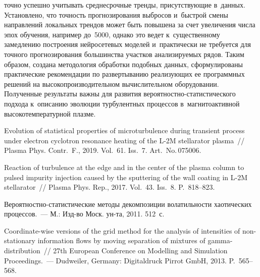\begin{multicols}{2}

\noindent
точно успешно учитывать среднесрочные тренды,
 присутствующие в~данных. Установлено, что точность прогнозирования 
 выбросов и~быстрой смены направлений локальных трендов может быть 
 повышена за счет увеличения числа эпох обучения, например до~5000, 
 однако это ведет к~су\-ще\-ст\-венному замедлению построения нейросетевых 
 моделей и~практически не требуется для точного прогнозирования
 большинства участков анализируемых 
 рядов. 
 Таким образом, создана методология обработки подобных данных, 
 сформулированы прак\-ти\-че\-ские рекомендации по развертыванию реализующих 
 ее программных решений на высокопроизводительном вычислительном 
 оборудовании. Полученные результаты важны для развития 
 ве\-ро\-ят\-ност\-но-ста\-ти\-сти\-че\-ско\-го 
 подхода к~описанию эволюции турбулентных процессов в~магнитоактивной 
 высокотемпературной плазме.
 
 \vspace*{-14pt}


{\small\frenchspacing
 {\baselineskip=10.8pt
 \begin{thebibliography}{99}
 
 \vspace*{-2pt}
 
Evolution of statistical properties of microturbulence 
during transient process under electron cyclotron resonance heating 
of the L-2M stellarator plasma~// Plasma Phys. 
Contr.~F., 2019. Vol.~61. Iss.~7. Art.~No.\,075006.

Reaction of turbulence at the edge and in the center of the plasma column to 
pulsed impurity injection caused by the sputtering of the wall coating 
in L-2M stellarator~// Plasma Phys. Rep., 2017. Vol.~43. Iss.~8. P.~818--823.

Ве\-ро\-ят\-ност\-но-ста\-ти\-сти\-че\-ские методы декомпозиции 
волатильности хаотических процессов.~--- М.: Изд-во Моск. ун-та, 2011. 512~с.

Coordinate-wise versions of the grid method for the analysis 
of intensities of non-stationary information flows by moving separation 
of mixtures of gamma-distribution~//  27th European Conference on 
Modelling and Simulation Proceedings.~--- Dudweiler, Germany: 
Digitaldruck Pirrot GmbH, 2013. P.~565--568.


\end{thebibliography}}}
\end{multicols}
